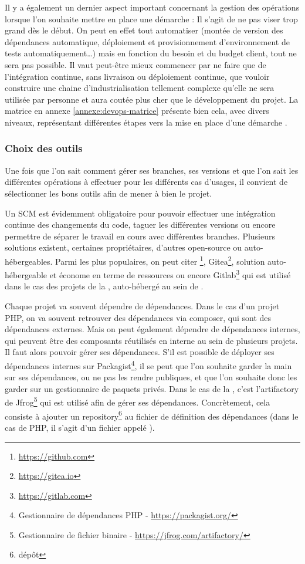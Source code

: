 Il y a également un dernier aspect important concernant la gestion des opérations lorsque l'on souhaite mettre en place une démarche \devops : Il s'agit de ne pas viser trop grand dès le début. On peut en effet tout automatiser (montée de version des dépendances automatique, déploiement et provisionnement d'environnement de tests automatiquement\ldots) mais en fonction du besoin et du budget client, tout ne sera pas possible. Il vaut peut-être mieux commencer par ne faire que de l'intégration continue, sans livraison ou déploiement continue, que vouloir construire une chaine d'industrialisation tellement complexe qu'elle ne sera utilisée par personne et aura coutée plus cher que le développement du projet. La matrice en annexe \ref{annexe:devops-matrice} présente bien cela, avec divers niveaux, représentant différentes étapes vers la mise en place d'une démarche \devops.

\subsubsection{Choix des outils}

Une fois que l'on sait comment gérer ses branches, ses versions et que l'on sait les différentes opérations à effectuer pour les différents cas d'usages, il convient de sélectionner les bons outils afin de mener à bien le projet.

Un \gls{SCM} est évidemment obligatoire pour pouvoir effectuer une intégration continue des changements du code, taguer les différentes versions ou encore permettre de séparer le travail en cours avec différentes branches. Plusieurs solutions existent, certaines propriétaires, d'autres open-source ou auto-hébergeables. Parmi les plus populaires, on peut citer \github\footnote{\url{https://github.com}}, Gitea\footnote{\url{https://gitea.io}}, solution auto-hébergeable et économe en terme de ressources ou encore Gitlab\footnote{\url{https://gitlab.com}} qui est utilisé dans le cas des projets de la \naq, auto-hébergé au sein de \onepoint.

Chaque projet va souvent dépendre de dépendances. Dans le cas d'un projet \gls{PHP}, on va souvent retrouver des dépendances via composer, qui sont des dépendances externes. Mais on peut également dépendre de dépendances internes, qui peuvent être des composants réutilisés en interne au sein de plusieurs projets. Il faut alors pouvoir gérer ses dépendances. S'il est possible de déployer ses dépendances internes sur Packagist\footnote{Gestionnaire de dépendances \gls{PHP} - \url{https://packagist.org/}}, il se peut que l'on souhaite garder la main sur ses dépendances, ou ne pas les rendre publiques, et que l'on souhaite donc les garder sur un gestionnaire de paquets privés. Dans le cas de la \naq, c'est l'\gls{artifactory} de Jfrog\footnote{Gestionnaire de fichier binaire - \url{https://jfrog.com/artifactory/}} qui est utilisé afin de gérer ses dépendances. Concrètement, cela consiste à ajouter un repository\footnote{dépôt} au fichier de définition des dépendances (dans le cas de \gls{PHP}, il s'agit d'un fichier appelé ).

